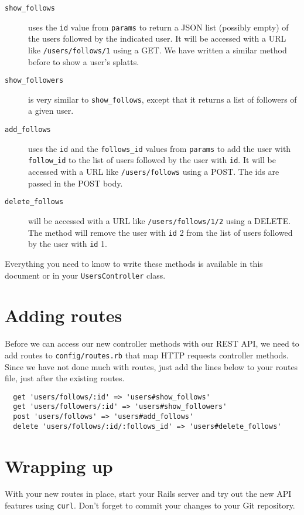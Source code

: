 \documentclass{article}
\begin{document}
\begin{description}
  \item[\texttt{show\_follows}] uses the \texttt{id} value from \texttt{params} to return a JSON list (possibly empty) of the users followed by the indicated user.  It will be accessed with a URL like \texttt{/users/follows/1} using a GET.  We have written a similar method before to show a user's splatts.
  \item[\texttt{show\_followers}]  is very similar to \texttt{show\_follows}, except that it returns a list of followers of a given user.
  \item[\texttt{add\_follows}] uses the \texttt{id} and the \texttt{follows\_id} values from \texttt{params} to add the user with \texttt{follow\_id} to the list of users followed by the user with \texttt{id}.  It will be accessed with a URL like \texttt{/users/follows} using a POST.  The ids are passed in the POST body.
  \item[\texttt{delete\_follows}]  will be accessed with a URL like \texttt{/users/follows/1/2} using a DELETE.  The method will remove the user with \texttt{id} 2 from the list of users followed by the user with \texttt{id} 1. 
\end{description}

Everything you need to know to write these methods is available in this document or in your \texttt{UsersController} class.

\section{Adding routes}
Before we can access our new controller methods with our REST API, we need to add routes to \texttt{config/routes.rb} that map HTTP requests controller methods.  Since we have not done much with routes, just add the lines below to your routes file, just after the existing routes.

\begin{verbatim}
  get 'users/follows/:id' => 'users#show_follows'
  get 'users/followers/:id' => 'users#show_followers'
  post 'users/follows' => 'users#add_follows'
  delete 'users/follows/:id/:follows_id' => 'users#delete_follows'
\end{verbatim}

\section{Wrapping up}
With your new routes in place, start your Rails server and try out the new API features using \texttt{curl}.  Don't forget to commit your changes to your Git repository.
\end{document}
